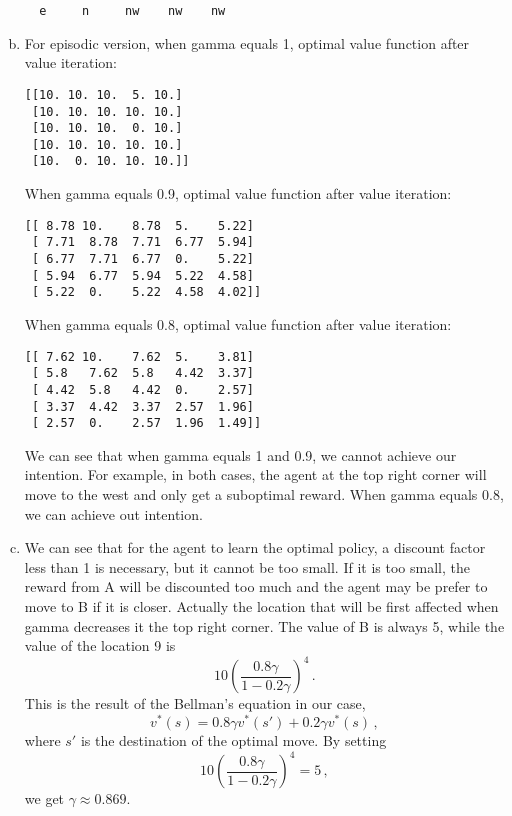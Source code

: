 \begin{enumerate}[(a)]
\begin{verbatim}
  e     n     nw    nw    nw
    \end{verbatim}
    \item For episodic version, when gamma equals 1, optimal value function
    after value iteration:
    \begin{verbatim}
[[10. 10. 10.  5. 10.]
 [10. 10. 10. 10. 10.]
 [10. 10. 10.  0. 10.]
 [10. 10. 10. 10. 10.]
 [10.  0. 10. 10. 10.]]
    \end{verbatim}
    When gamma equals 0.9, optimal value function after value iteration:
    \begin{verbatim}
[[ 8.78 10.    8.78  5.    5.22]
 [ 7.71  8.78  7.71  6.77  5.94]
 [ 6.77  7.71  6.77  0.    5.22]
 [ 5.94  6.77  5.94  5.22  4.58]
 [ 5.22  0.    5.22  4.58  4.02]]
    \end{verbatim}
    When gamma equals 0.8, optimal value function after value iteration:
    \begin{verbatim}
[[ 7.62 10.    7.62  5.    3.81]
 [ 5.8   7.62  5.8   4.42  3.37]
 [ 4.42  5.8   4.42  0.    2.57]
 [ 3.37  4.42  3.37  2.57  1.96]
 [ 2.57  0.    2.57  1.96  1.49]]
    \end{verbatim}
    We can see that when gamma equals 1 and 0.9, we cannot achieve our intention. For example, in both
    cases, the agent at the top right corner will move to the west and only get a suboptimal reward.
    When gamma equals 0.8, we can achieve out intention.
    \item
    We can see that for the agent to learn the optimal policy, a discount factor less than 1 is necessary,
    but it cannot be too small. If it is too small, the reward from A will be discounted too much and
    the agent may be prefer to move to B if it is closer. Actually the location that will be first affected
    when gamma decreases it the top right corner. The value of B is always 5, while the value of the
    location 9 is
    \[
        10\left(\frac{0.8\gamma}{1-0.2\gamma}\right)^4\,.
    \]
    This is the result of the Bellman's equation in our case,
    \[
        v^*(s) = 0.8\gamma v^*(s') + 0.2\gamma v^*(s)\,,
    \]
    where $ s' $ is the destination of the optimal move.
    By setting
    \[
        10\left(\frac{0.8\gamma}{1-0.2\gamma}\right)^4 = 5\,,
    \]
    we get $ \gamma \approx 0.869 $.
\end{enumerate}
